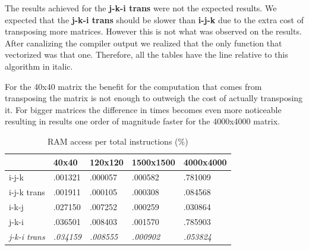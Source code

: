 \documentclass[a4paper]{report}
\begin{document}
The results achieved for the \textbf{j-k-i trans} were not the expected results.
We expected that the \textbf{j-k-i trans} should be slower than \textbf{i-j-k}
due to the extra cost of transposing more matrices. However this is not what was
observed on the results. After canalizing the compiler output we realized that
the only function that vectorized was that one. Therefore, all the tables have
the line relative to this algorithm in italic.

For the 40x40 matrix the benefit for the computation that comes from transposing
the matrix is not enough to outweigh the cost of actually transposing it. For
bigger matrices the difference in times becomes even more noticeable resulting in
results one order of magnitude faster for the 4000x4000 matrix.

\begin{table}[H]
\centering
\begin{tabular}{|l|l|l|l|l|}
\hline
            & 40x40   & 120x120 & 1500x1500 & 4000x4000 \\ \hline
i-j-k       & .001321 & .000057 & .000582   & .781009   \\ \hline
i-j-k trans & .001911 & .000105 & .000308   & .084568   \\ \hline
i-k-j       & .027150 & .007252 & .000259   & .030864   \\ \hline
j-k-i       & .036501 & .008403 & .001570   & .785903   \\ \hline
\textit{j-k-i trans} & \textit{.034159} & \textit{.008555} & \textit{.000902}
                     & \textit{.053824}   \\ \hline
\end{tabular}
\caption{RAM access per total instructions (\%)}
\end{table}
\end{document}
